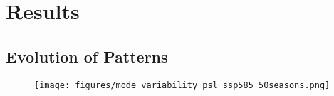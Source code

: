 \chapter{Results}
\label{ch:results}


\section{Evolution of Patterns}


\begin{figure}
  \begin{center}
    \texttt{[image: figures/mode\_variability\_psl\_ssp585\_50seasons.png]}
  \end{center}
  \caption{}\label{fig:}
\end{figure}

